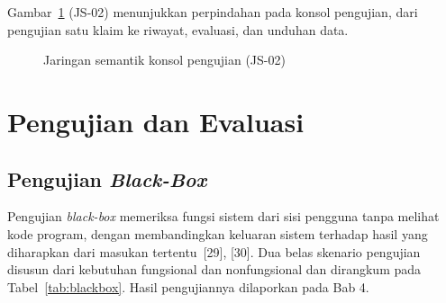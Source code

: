 \documentclass[12pt,a4paper,twoside]{report}
\begin{document}
Gambar~\ref{fig:jskonsol} (JS-02) menunjukkan perpindahan pada konsol pengujian, dari pengujian satu klaim ke riwayat, evaluasi, dan unduhan data.

\begin{figure}[H]
  \centering
  \caption{Jaringan semantik konsol pengujian (JS-02)}
  \label{fig:jskonsol}
\end{figure}


\section{Pengujian dan Evaluasi}\label{sec:evaluasi}

\subsection{Pengujian \textit{Black-Box}}

Pengujian \textit{black-box} memeriksa fungsi sistem dari sisi pengguna tanpa melihat kode program, dengan membandingkan keluaran sistem terhadap hasil yang diharapkan dari masukan tertentu~[29], [30]. Dua belas skenario pengujian disusun dari kebutuhan fungsional dan nonfungsional dan dirangkum pada Tabel~\ref{tab:blackbox}. Hasil pengujiannya dilaporkan pada Bab 4.
\end{document}

